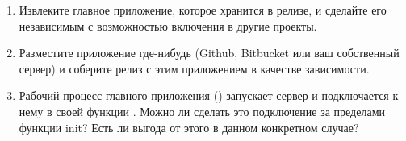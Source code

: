 \begin{enumerate}
	\item Извлеките главное приложение, которое хранится в релизе, и сделайте его независимым с возможностью включения в другие проекты.
	\item Разместите приложение где-нибудь (Github, Bitbucket или ваш собственный сервер) и соберите релиз с этим приложением в качестве зависимости.
	\item Рабочий процесс главного приложения () запускает сервер и подключается к нему в своей функции . Можно ли сделать это подключение за пределами функции init? Есть ли выгода от этого в данном конкретном случае?
\end{enumerate}


